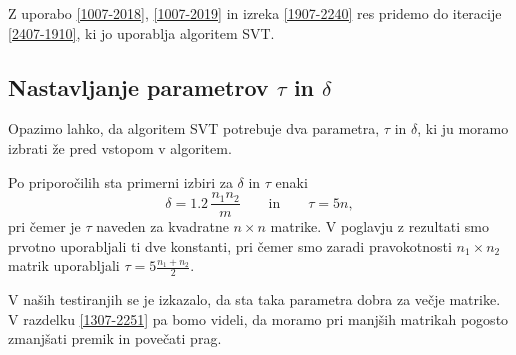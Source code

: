 Z uporabo \eqref{1007-2018}, \eqref{1007-2019}
in izreka \ref{1907-2240}
res pridemo do iteracije
\eqref{2407-1910}, ki jo uporablja algoritem SVT.
\iffalse
Tako res pridemo 
Po trditvi lahko sedaj zapišemo algoritem \eqref{1007-2018} - \eqref{1007-2019} kot \cite{CCS}
\[
    \begin{cases}
        X^k = \shrink_\tau(Y^{k-1}) \\
        Y^k = Y^{k-1} + \delta_k \proj(M - X^k) 
    \end{cases}
\]
\fi

\subsection{Nastavljanje parametrov $\tau$ in $\delta$} \label{1907-1648}
Opazimo lahko, da algoritem SVT potrebuje dva parametra, $\tau$ in $\delta$, ki ju moramo izbrati 
že pred vstopom v algoritem.

Po priporočilih \cite{CCS}
sta primerni izbiri za $\delta$ in $\tau$
enaki 
\[
    \delta = 1.2\, \dfrac{n_1 n_2}{m}\qquad\text{in}\qquad
    \tau = 5n,
\]
pri čemer je $\tau$ naveden za kvadratne $n\times n$ matrike.
V poglavju z rezultati smo prvotno uporabljali ti dve konstanti, pri 
čemer smo zaradi
pravokotnosti $n_1\times n_2$ matrik uporabljali
$\tau = 5\frac{n_1+n_2}{2}$.
\iffalse
Medtem, ko so koraki v samem algoritmu definirani kot množica korakov, 
smo v okviru rezultatov diplomske naloge, prvotno za premik uporabljali konstanto, ter korak nastavili na 
 po priporočilih \cite{CCS}. 
 \fi
\iffalse
Prav tako članek \cite{CCS} navaja, da je za matrike velikosti $\mathbb{R}^{n \times n}$ smiselno nastaviti $\tau = 5n$, vendar sem v moji implementaciji zaradi posploševanja na nekvadratne matrike, za matrike velikosti $\mathbb{R}^{n_1 \times n_2}$ parameter nastavil na
\[
    \tau = 5\, \frac{n_1+n_2}{2}
\]
\fi
V naših testiranjih se je izkazalo, da sta taka parametra dobra za večje matrike. V razdelku \ref{1307-2251} pa bomo videli, da moramo pri manjših matrikah pogosto zmanjšati premik in povečati prag.